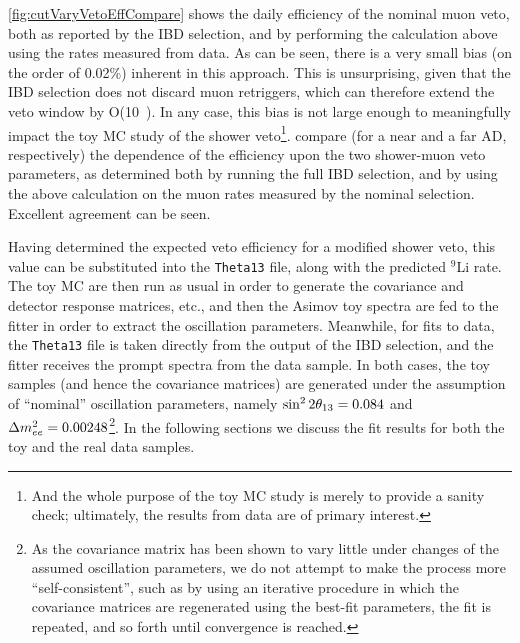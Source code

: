 \documentclass[../thesis.tex]{subfiles}
\begin{document}
\autoref{fig:cutVaryVetoEffCompare} shows the daily efficiency of the nominal muon veto, both as reported by the IBD selection, and by performing the calculation above using the rates measured from data. As can be seen, there is a very small bias (on the order of 0.02\%) inherent in this approach. This is unsurprising, given that the IBD selection does not discard muon retriggers, which can therefore extend the veto window by O(10~\us). In any case, this bias is not large enough to meaningfully impact the toy MC study of the shower veto\footnote{And the whole purpose of the toy MC study is merely to provide a sanity check; ultimately, the results from data are of primary interest.}.  compare (for a near and a far AD, respectively) the dependence of the efficiency upon the two shower-muon veto parameters, as determined both by running the full IBD selection, and by using the above calculation on the muon rates measured by the nominal selection. Excellent agreement can be seen.

Having determined the expected veto efficiency for a modified shower veto, this value can be substituted into the \texttt{Theta13} file, along with the predicted $^9$Li rate. The toy MC are then run as usual in order to generate the covariance and detector response matrices, etc., and then the Asimov toy spectra are fed to the fitter in order to extract the oscillation parameters. Meanwhile, for fits to data, the \texttt{Theta13} file is taken directly from the output of the IBD selection, and the fitter receives the prompt spectra from the data sample. In both cases, the toy samples (and hence the covariance matrices) are generated under the assumption of ``nominal'' oscillation parameters, namely $\sin^2 2\theta_{13} = 0.084$ and $\Delta m^2_{ee} = 0.00248$\footnote{As the covariance matrix has been shown to vary little under changes of the assumed oscillation parameters, we do not attempt to make the process more ``self-consistent'', such as by using an iterative procedure in which the covariance matrices are regenerated using the best-fit parameters, the fit is repeated, and so forth until convergence is reached.}. In the following sections we discuss the fit results for both the toy and the real data samples.

\begin{comment}
Regarding results: Don't comment on ``structure'' until we've regenerated the 2D plots using the fix to SinglesCalc::calcSinglesHz. (Accidentals rate might have been biased, throwing off the fit.)
\end{comment}
\end{document}
